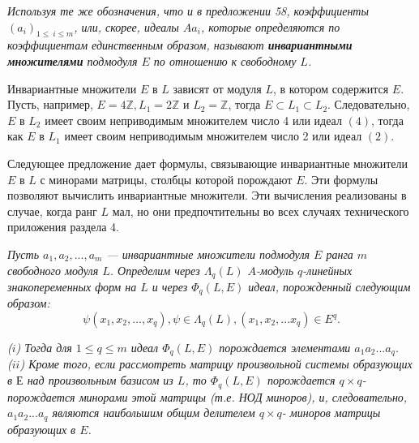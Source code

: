 \begin{determ}
\hspace*{0.5cm}

\textit{Используя те же обозначения, что и в предложении 58, коэффициенты $(a_i)_{1 \leqslant\ i \leqslant m}$, или, скорее, идеалы $Aa_i$, которые определяются по коэффициентам единственным образом, называют \textbf{инвариантными множителями} подмодуля $E$ по отношению к свободному $L$.}\\
\begin{mynotice}
Инвариантные множители $E$ в $L$ зависят от модуля $L$, в котором содержится $E$. Пусть, например, $E = 4 \mathbb{Z}, L_1 = 2 \mathbb{Z}$ и $L_2 = \mathbb{Z}$, тогда $E \subset L_1 \subset L_2$. Следовательно, $E$ в $L_2$ имеет своим 
неприводимым множителем число 4 или идеал $(4)$, тогда как $E$ в $L_1$ имеет своим неприводимым множителем число 2 или идеал $(2)$.\\
\end{mynotice}

Следующее предложение дает формулы, связывающие  
инвариантные множители $E$ в $L$ с минорами матрицы, столбцы которой  порождают  $E$. Эти формулы позволяют вычислить инвариантные  множители. Эти вычисления реализованы в случае, когда ранг $L$ мал, но они предпочтительны во всех случаях технического приложения раздела 4. 
\end{determ}
\begin{predl}
\hspace*{0.5cm}

\textit{Пусть $a_1, a_2, ..., a_m$ — инвариантные множители подмодуля $E$ ранга $m$ свободного модуля $L$. Определим через
$\Lambda_q (L)$ $A$-модуль $q$-линейных знакопеременных форм на $L$ и через $\Phi _q (L, E)$ идеал, порожденный следующим образом:}
$$ \psi (x_1, x_2, ..., x_q), \psi \in \Lambda _q (L), (x_1, x_2, ... x_q) \in E^{q}.$$

\textit{($i$) Тогда для $ 1 \leqslant q \leqslant m$ идеал $\Phi _q (L, E)$ порождается элементами $a_1a_2 ...a_q$.}\\

\textit{($ii$) Кроме того, если рассмотреть матрицу произвольной системы образующих в $Е$ над произвольным базисом из $L$, то $\Phi _q (L, E)$ порождается $q \times q$- порождается минорами этой матрицы (т.е. НОД миноров), и, следовательно, $a_1 a_2 ...a_q$ являются наибольшим общим делителем $q \times q$- миноров матрицы образующих в $E$.}
\end{predl}
